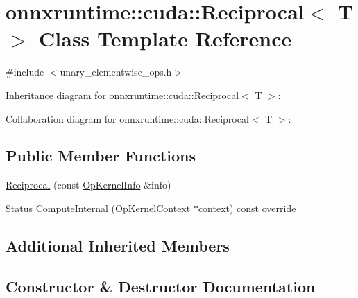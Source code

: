 \hypertarget{classonnxruntime_1_1cuda_1_1Reciprocal}{}\section{onnxruntime\+:\+:cuda\+:\+:Reciprocal$<$ T $>$ Class Template Reference}
\label{classonnxruntime_1_1cuda_1_1Reciprocal}


{\ttfamily \#include $<$unary\+\_\+elementwise\+\_\+ops.\+h$>$}



Inheritance diagram for onnxruntime\+:\+:cuda\+:\+:Reciprocal$<$ T $>$\+:


Collaboration diagram for onnxruntime\+:\+:cuda\+:\+:Reciprocal$<$ T $>$\+:
\subsection*{Public Member Functions}
\begin{DoxyCompactItemize}
\item 
\mbox{\hyperlink{classonnxruntime_1_1cuda_1_1Reciprocal_ace28a3fc7716e5cad4eed2ad4dcf6ea5}{Reciprocal}} (const \mbox{\hyperlink{classonnxruntime_1_1OpKernelInfo}{Op\+Kernel\+Info}} \&info)
\item 
\mbox{\hyperlink{classonnxruntime_1_1common_1_1Status}{Status}} \mbox{\hyperlink{classonnxruntime_1_1cuda_1_1Reciprocal_aa4aef164f01dedd8969d326ab2f37a0d}{Compute\+Internal}} (\mbox{\hyperlink{classonnxruntime_1_1OpKernelContext}{Op\+Kernel\+Context}} $\ast$context) const override
\end{DoxyCompactItemize}
\subsection*{Additional Inherited Members}


\subsection{Constructor \& Destructor Documentation}
\mbox{\label{classonnxruntime_1_1cuda_1_1Reciprocal_ace28a3fc7716e5cad4eed2ad4dcf6ea5}} 
